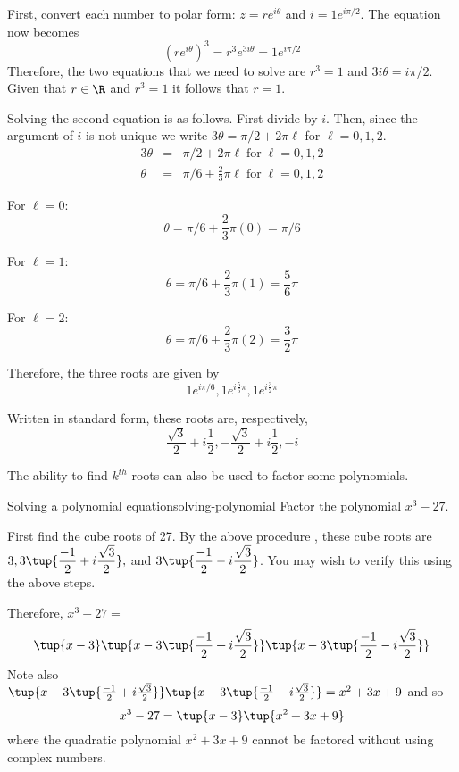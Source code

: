 \begin{solution}
First, convert each number to polar form: $z = re^{i\theta}$ and $i = 1 e^{i \pi/2}$. The equation now becomes
\[
(re^{i\theta})^3 = r^3 e^{3i\theta} = 1 e^{i \pi/2}
\]
Therefore, the two equations that we need to solve are $r^3 = 1$ and $3i\theta = i \pi/2$. Given that $r \in \R$ and $r^3 = 1$ it follows that $r=1$. 

Solving the second equation is as follows. First divide by $i$. Then, since the argument of $i$ is not unique we write $3\theta = \pi/2 + 2\pi\ell$ for $\ell = 0,1,2$. 
\begin{eqnarray*}
3\theta &=& \pi/2 + 2\pi\ell \; \mbox{for} \; \ell = 0,1,2 \\
\theta &=& \pi/6 + \frac{2}{3} \pi\ell \; \mbox{for} \; \ell = 0,1,2 
\end{eqnarray*}

For $\ell = 0$:
\[
\theta = \pi/6 + \frac{2}{3} \pi (0) = \pi/6
\]

For $\ell = 1$:
\[
\theta = \pi/6 + \frac{2}{3} \pi(1) = \frac{5}{6} \pi
\]

For $\ell = 2$:
\[
\theta = \pi/6 + \frac{2}{3} \pi(2) = \frac{3}{2} \pi
\]

Therefore, the three roots are given by \[
1e^{i \pi/6}, 1e^{i \frac{5}{6}\pi}, 1e^{i \frac{3}{2}\pi}
\]

Written in standard form, these roots are, respectively,
\[
\frac{\sqrt{3}}{2} + i \frac{1}{2}, -\frac{\sqrt{3}}{2} + i \frac{1}{2}, -i
\]

\end{solution}

The ability to find $k^{th}$ roots can also be used to factor some
polynomials.

\begin{example}{Solving a polynomial equation}{solving-polynomial}
Factor the polynomial $x^{3}-27.$
\end{example}

\begin{solution}
First find the cube roots of 27. By the above procedure
, these cube roots
are $3,3\tup{\displaystyle
\frac{-1}{2}+i\displaystyle\frac{\sqrt{3}}{2}} ,$ and $3\tup{
\displaystyle\frac{-1}{2}-i\displaystyle\frac{\sqrt{3}}{2}} $. You may wish to verify 
this using the above steps.

Therefore, $x^{3}-27 =$
\begin{equation*}
 \tup{x-3} \tup{x-3\tup{\frac{-1}{2}+i\frac{\sqrt{3}}{2}}
} \tup{x-3\tup{\frac{-1}{2}-i\frac{\sqrt{3}}{2}} } 
\end{equation*}
Note also $\tup{x-3\tup{\frac{-1}{2}+i\frac{\sqrt{3}}{2}} }
\tup{x-3\tup{\frac{-1}{2}-i\frac{\sqrt{3}}{2}} }
=\allowbreak x^{2}+3x+9$ and so
\begin{equation*}
x^{3}-27=\tup{x-3} \tup{x^{2}+3x+9}
\end{equation*}
where the quadratic polynomial $x^{2}+3x+9$ cannot be factored without using
complex numbers.
\end{solution}

